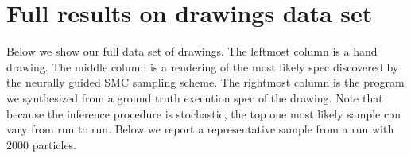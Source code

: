 \documentclass{article}
\newcommand{\probability}{\mathds{P}} %
\begin{document}



\section{Full results on drawings data set}

Below we show our full data set of drawings. The leftmost column is a hand drawing. The middle column is a rendering of the most likely spec discovered by the neurally guided SMC sampling scheme. The rightmost column is the program we synthesized from a ground truth execution spec of the drawing.
Note that because the inference procedure is stochastic,
the top one most likely sample can vary from run to run.
Below we report a representative sample from a run with 2000 particles.


 



{\small }
 
\end{document}
